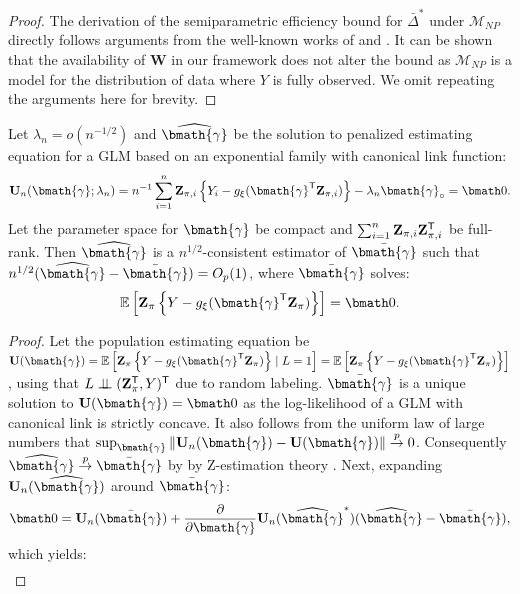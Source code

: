 \documentclass[useAMS,referee,usenatbib]{biom}
\def\bW{\mathbf{W}}
\def\bZ{\mathbf{Z}}
\def\bU{\mathbf{U}}
\def\bgam{\bmath{\gamma}}
\def\bgamhat{\widehat{\bmath{\gamma}}}
\def\bgambar{\bar{\bmath{\gamma}}}
\def\Deltabarstr{\bar{\Delta}^*}
\def\bzero{\bmath 0}
\def\Mscr{\mathcal{M}}
\def\trans{^{\sf \tiny T}}
\def\indep{\perp\!\!\!\perp}
\def\bZpi{\bZ_{\pi}}
\def\bZpii{\bZ_{\pi,i}}
\def\E{\mathbb{E}}
\def\bZpi{\bZ_{\pi}}
\def\bZpii{\bZ_{\pi,i}}
\newcommand{\norm}[1]{\left\lVert#1\right\rVert}
\begin{document}
\begin{proof}
The derivation of the semiparametric efficiency bound for $\Deltabarstr$ under $\Mscr_{NP}$ directly follows arguments from the well-known works of \cite{robins1994estimation} and \cite{hahn1998role}. It can be shown that the availability of $\bW$ in our framework does not alter the bound as $\Mscr_{NP}$ is a model for the distribution of data where $Y$ is fully observed. We omit repeating the arguments here for brevity.
\end{proof}

\begin{lemma}
    \label{thm:0}
    Let $\lambda_n = o(n^{-1/2})$ and $\bgamhat$ be the solution to penalized estimating equation for a GLM based on an exponential family with canonical link function:
    \begin{align*}
        \bU_n(\bgam;\lambda_n) = n^{-1}\sum_{i=1}^n \bZpii \left\{ Y_i - g_{\xi}(\bgam\trans\bZpii)\right\} - \lambda_n \bgam_{\circ} = \bzero.
    \end{align*}
    Let the parameter space for $\bgam$ be compact and $\sum_{i=1}^n \bZpii \bZpii\trans$ be full-rank. Then  $\bgamhat$ is a $n^{1/2}$-consistent estimator of $\bgambar$ such that $n^{1/2}(\bgamhat - \bgambar) = O_p(1)$, where $\bgambar$ solves:
    \begin{align*}
        \E\left[ \bZpi \left\{ Y - g_{\xi}(\bgam\trans\bZpi)\right\}\right] = \bzero.
    \end{align*}
    \begin{proof}
        Let the 
        population estimating equation be $\bU(\bgam) = \E\left[ \bZpi \left\{ Y - g_{\xi}(\bgam\trans\bZpi)\right\}\mid L = 1\right] = \E\left[ \bZpi \left\{ Y - g_{\xi}(\bgam\trans\bZpi)\right\}\right]$, using that $L \indep (\bZpi\trans,Y)\trans$ due to random labeling.
        $\bgambar$ is a unique solution to $\bU(\bgam)=\bzero$ as the log-likelihood of a GLM with canonical link is strictly concave.  It also follows from the uniform law of large numbers \cite{newey1994large} that 
        $\sup_{\bgam}\norm{\bU_n(\bgam)-\bU(\bgam)}\overset{p}{\to}0$. Consequently $\bgamhat \overset{p}{\to} \bgambar$ by
        by Z-estimation theory \citep{van2000asymptotic}.
        Next, expanding $\bU_n(\bgamhat)$ around $\bgambar$:
        \begin{align*}
            \bzero = \bU_n(\bgambar) + \frac{\partial}{\partial\bgam}\bU_n(\bgamhat^*) (\bgamhat-\bgambar),
        \end{align*}
        which yields:
        \begin{align*}

\end{align*}
\end{proof}
\end{lemma}
\end{document}
